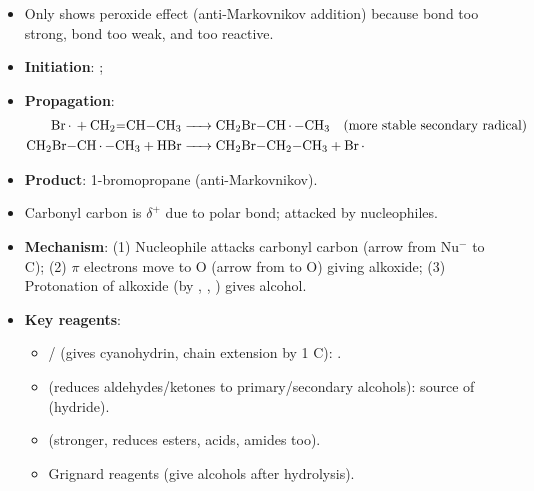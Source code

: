 \documentclass[11pt]{article}
\begin{document}
\begin{propriete}
\begin{itemize}
\item Only  shows peroxide effect (anti-Markovnikov addition) because  bond too strong,  bond too weak, and  too reactive.
\item \textbf{Initiation}: ; 
\item \textbf{Propagation}:
\begin{align*}
\ce{Br. + CH2=CH-CH3 &-> CH2Br-CH.-CH3} \quad \text{(more stable secondary radical)} \\
\ce{CH2Br-CH.-CH3 + HBr &-> CH2Br-CH2-CH3 + Br.}
\end{align*}
\item \textbf{Product}: 1-bromopropane (anti-Markovnikov).
\end{itemize}
\end{propriete}

\begin{propriete}
\begin{itemize}
\item Carbonyl carbon is $\delta^+$ due to polar  bond; attacked by nucleophiles.
\item \textbf{Mechanism}: (1) Nucleophile attacks carbonyl carbon (arrow from Nu$^-$ to C); (2) $\pi$ electrons move to O (arrow from  to O) giving alkoxide; (3) Protonation of alkoxide (by , , ) gives alcohol.
\item \textbf{Key reagents}:
\begin{itemize}
\item {}/ (gives cyanohydrin, chain extension by 1 C): .
\item {} (reduces aldehydes/ketones to primary/secondary alcohols): source of  (hydride).
\item {} (stronger, reduces esters, acids, amides too).
\item Grignard reagents  (give alcohols after hydrolysis).
\end{itemize}
\end{itemize}
\end{propriete}
\end{document}
